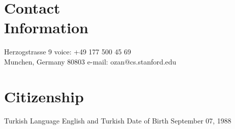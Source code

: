 \documentclass[margin,line,10pt]{resume}
\begin{document}
\begin{resume}

    \section{\mysidestyle \textcolor{olgray}{Contact\\Information}}
    Herzogstrasse 9        \hfill voice: +49 177 500 45 69          \vspace{0mm}\\\vspace{0mm}%
    Munchen, Germany 80803 \hfill e-mail: ozan@cs.stanford.edu \vspace{0mm}\\\vspace{0mm}%



%
%
%


\section{\mysidestyle \textcolor{olgray}{Citizenship}} Turkish \hspace{13.9mm} {\mysidestyle \textcolor{olgray}{Language}} \hspace{3.56mm} English and Turkish \hfill {\mysidestyle \textcolor{olgray}{Date of Birth}}  \hspace{3.56mm} September 07, 1988

\end{resume}
\end{document}
